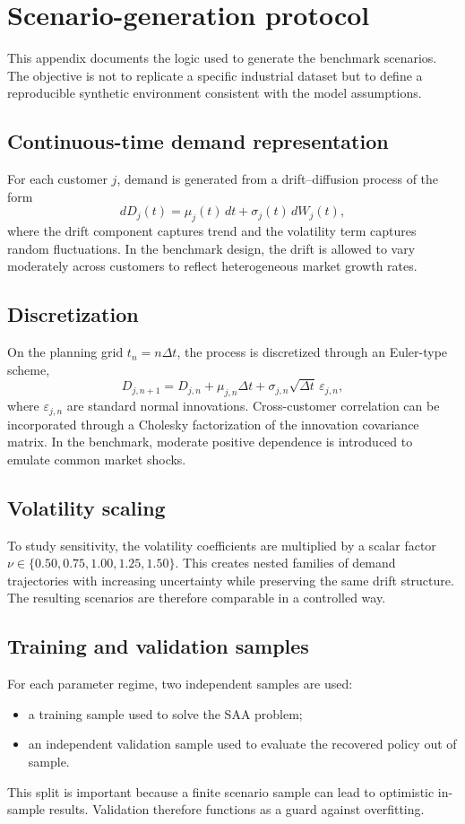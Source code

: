 \section{Scenario-generation protocol}
This appendix documents the logic used to generate the benchmark scenarios. The objective is not to replicate a specific industrial dataset but to define a reproducible synthetic environment consistent with the model assumptions.

\subsection{Continuous-time demand representation}
For each customer $j$, demand is generated from a drift--diffusion process of the form
\begin{equation}
 dD_j(t)=\mu_j(t)\,dt+\sigma_j(t)\,dW_j(t),
\end{equation}
where the drift component captures trend and the volatility term captures random fluctuations. In the benchmark design, the drift is allowed to vary moderately across customers to reflect heterogeneous market growth rates.

\subsection{Discretization}
On the planning grid $t_n=n\Delta t$, the process is discretized through an Euler-type scheme,
\begin{equation}
 D_{j,n+1}=D_{j,n}+\mu_{j,n}\Delta t+\sigma_{j,n}\sqrt{\Delta t}\,\varepsilon_{j,n},
\end{equation}
where $\varepsilon_{j,n}$ are standard normal innovations. Cross-customer correlation can be incorporated through a Cholesky factorization of the innovation covariance matrix. In the benchmark, moderate positive dependence is introduced to emulate common market shocks.

\subsection{Volatility scaling}
To study sensitivity, the volatility coefficients are multiplied by a scalar factor $\nu\in\{0.50,0.75,1.00,1.25,1.50\}$. This creates nested families of demand trajectories with increasing uncertainty while preserving the same drift structure. The resulting scenarios are therefore comparable in a controlled way.

\subsection{Training and validation samples}
For each parameter regime, two independent samples are used:
\begin{itemize}[leftmargin=1.8em]
    \item a training sample used to solve the SAA problem;
    \item an independent validation sample used to evaluate the recovered policy out of sample.
\end{itemize}
This split is important because a finite scenario sample can lead to optimistic in-sample results. Validation therefore functions as a guard against overfitting.

